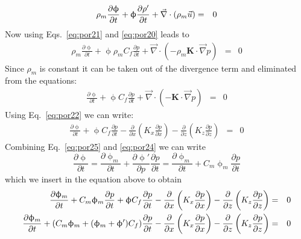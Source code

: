\begin{eqnarray}
\rho_m \frac{\partial \upphi}{\partial t} 
+\upphi \frac{\partial \rho' }{\partial t} 
+ \vec\nabla\cdot (\rho_m \vec{u}) &=& 0 \nonumber
\end{eqnarray}
Now using Eqs.~\eqref{eq:por21} and \eqref{eq:por20} leads to
\begin{eqnarray}
\rho_m \frac{\partial \upphi}{\partial t} 
+\upphi \rho_m C_f \frac{\partial p}{\partial t} 
+ \vec\nabla\cdot (- \rho_m {\bm K} \cdot \vec\nabla p) &=& 0 
\end{eqnarray}
Since $\rho_m$ is constant it can be taken out of the divergence term 
and eliminated from the equations:
\begin{eqnarray}
 \frac{\partial \upphi}{\partial t} 
+\upphi  C_f \frac{\partial p}{\partial t} 
+ \vec\nabla\cdot (- {\bm K} \cdot \vec\nabla p) &=& 0 
\end{eqnarray}
Using Eq.~\eqref{eq:por22} we can write:
\begin{eqnarray}
\frac{\partial \upphi}{\partial t} 
+\upphi  C_f \frac{\partial p}{\partial t} 
- \frac{\partial}{\partial x} \left( K_x \frac{\partial p}{\partial x} \right) 
- \frac{\partial}{\partial z} \left( K_z \frac{\partial p}{\partial z} \right) 
&=& 0 
\end{eqnarray}
Combining Eq.~\eqref{eq:por25} and \eqref{eq:por24} we can write
\[
\frac{\partial \upphi}{\partial t}
=\frac{\partial \upphi_m}{\partial t} +\frac{\partial \upphi'}{\partial p} \frac{\partial p}{\partial t}
=\frac{\partial \upphi_m}{\partial t} + C_m \upphi_m \frac{\partial p}{\partial t}
\]
which we insert in the equation above to obtain
\begin{eqnarray}
\frac{\partial \upphi_m}{\partial t} + C_m \upphi_m \frac{\partial p}{\partial t}
+\upphi  C_f \frac{\partial p}{\partial t} 
- \frac{\partial}{\partial x} \left( K_x \frac{\partial p}{\partial x} \right) 
- \frac{\partial}{\partial z} \left( K_z \frac{\partial p}{\partial z} \right) 
&=& 0 \nonumber\\
\frac{\partial \upphi_m}{\partial t} 
+ (C_m \upphi_m 
+ (\upphi_m+\upphi' ) C_f )\frac{\partial p}{\partial t} 
- \frac{\partial}{\partial x} \left( K_x \frac{\partial p}{\partial x} \right) 
- \frac{\partial}{\partial z} \left( K_z \frac{\partial p}{\partial z} \right) 
&=& 0 
\end{eqnarray}
